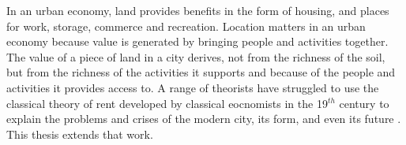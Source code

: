 
In an urban economy, land provides benefits in the form of housing, and places for work, storage, commerce and recreation. Location matters in an urban economy because value is generated by bringing people and activities together. The value of a piece of land in a city derives, not from the richness of the soil, but from the richness of the activities it supports and because of the people and activities it provides access to. A range of theorists have struggled to use the classical theory of rent developed by classical eocnomists in the 19$^{th}$ century to explain the problems and crises of the modern city, its form, and even its future \cite{hailaTheoryLandRent1990, jagerUrbanLandRent2003, harveyUrbanProcessCapitalism1978}. This thesis extends that work. 

